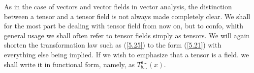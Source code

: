 As in the case of vectors and vector fields in vector analysis, the distinction between a tensor and a tensor field is not always made completely clear. We shall for the most part be dealing with tensor field from now on, but to confo, whith general usage we shall often refer to tensor fields simply as tensors. We will again shorten the transformation law such as (\ref{5.25}) to the form (\ref{5.21}) with everything else being implied. If we wish to emphasize that a tensor is a field. we shall write it in functional form, namely, as $T_{b...}^{a...}(x)$.

